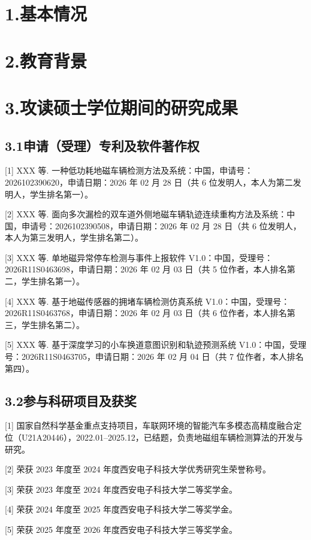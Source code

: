 
\section*{1.\quad 基本情况}

\section*{2.\quad 教育背景}

\section*{3.\quad 攻读硕士学位期间的研究成果}

\subsection*{3.1\quad 申请（受理）专利及软件著作权}

[1] XXX 等. 一种低功耗地磁车辆检测方法及系统：中国，申请号：2026102390620，申请日期：2026 年 02 月 28 日（共 6 位发明人，本人为第二发明人，学生排名第一）。

[2] XXX 等. 面向多次漏检的双车道外侧地磁车辆轨迹连续重构方法及系统：中国，申请号：2026102390508，申请日期：2026 年 02 月 28 日（共 6 位发明人，本人为第三发明人，学生排名第二）。

[3] XXX 等. 单地磁异常停车检测与事件上报软件 V1.0：中国，受理号：2026R11S0463698，申请日期：2026 年 02 月 03 日（共 5 位作者，本人排名第二，学生排名第一）。

[4] XXX 等. 基于地磁传感器的拥堵车辆检测仿真系统 V1.0：中国，受理号：2026R11S0463768，申请日期：2026 年 02 月 03 日（共 6 位作者，本人排名第三，学生排名第二）。

[5] XXX 等. 基于深度学习的小车换道意图识别和轨迹预测系统 V1.0：中国，受理号：2026R11S0463705，申请日期：2026 年 02 月 04 日（共 7 位作者，本人排名第四）。

\subsection*{3.2\quad 参与科研项目及获奖}

[1] 国家自然科学基金重点支持项目，车联网环境的智能汽车多模态高精度融合定位（U21A20446），2022.01--2025.12，已结题，负责地磁组车辆检测算法的开发与研究。

[2] 荣获 2023 年度至 2024 年度西安电子科技大学优秀研究生荣誉称号。

[3] 荣获 2023 年度至 2024 年度西安电子科技大学二等奖学金。

[4] 荣获 2024 年度至 2025 年度西安电子科技大学二等奖学金。

[5] 荣获 2025 年度至 2026 年度西安电子科技大学三等奖学金。


